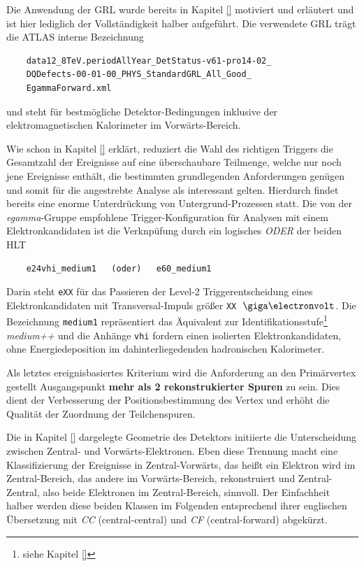 \begin{description}
        Die Anwendung der \ac{GRL} wurde bereits in Kapitel \ref{} motiviert
        und erläutert und ist hier lediglich der Vollständigkeit halber
        aufgeführt. Die verwendete \ac{GRL} trägt die ATLAS interne Bezeichnung
        \begin{verbatim}
    data12_8TeV.periodAllYear_DetStatus-v61-pro14-02_
    DQDefects-00-01-00_PHYS_StandardGRL_All_Good_
    EgammaForward.xml \end{verbatim}
        und steht für bestmögliche Detektor-Bedingungen inklusive der
        elektromagnetischen Kalorimeter im Vorwärts-Bereich.

        Wie schon in Kapitel \ref{} erklärt, reduziert die Wahl des richtigen
        Triggers die Gesamtzahl der Ereignisse auf eine überschaubare
        Teilmenge, welche nur noch jene Ereignisse enthält, die bestimmten
        grundlegenden Anforderungen genügen und somit für die angestrebte
        Analyse als interessant gelten. Hierdurch findet bereits eine enorme
        Unterdrückung von Untergrund-Prozessen statt. Die von der
        \textit{egamma}-Gruppe empfohlene Trigger-Konfiguration für Analysen
        mit einem Elektronkandidaten ist die Verknpüfung durch ein logisches
        \emph{ODER} der beiden \acl{HLT}
        \begin{verbatim}
    e24vhi_medium1   (oder)   e60_medium1 \end{verbatim}
        Darin steht \texttt{eXX} für das Passieren der Level-2
        Triggerentscheidung eines Elektronkandidaten mit Transversal-Impuls
        größer \texttt{XX} $\GeV$. Die Bezeichnung \texttt{medium1}
        repräsentiert das Äquivalent zur Identifikationsstufe\footnote{siehe
        Kapitel \ref{}} \textit{medium++} und die Anhänge \texttt{vhi} fordern
        einen isolierten Elektronkandidaten, ohne Energiedeposition im
        dahinterliegedenden hadronischen Kalorimeter.

        Als letztes ereignisbasiertes Kriterium wird die Anforderung an den
        Primärvertex gestellt Ausgangspunkt \textbf{mehr als 2 rekonstrukierter
        Spuren} zu sein. Dies dient der Verbesserung der Positionsbestimmung
        des Vertex und erhöht die Qualität der Zuordnung der Teilchenspuren.

        Die in Kapitel \ref{} dargelegte
        Geometrie des Detektors initiierte die Unterscheidung zwischen
        Zentral- und Vorwärts-Elektronen. Eben diese Trennung macht eine
        Klassifizierung der Ereignisse in Zentral-Vorwärts, das heißt ein
        Elektron wird im Zentral-Bereich, das andere im Vorwärts-Bereich,
        rekonstruiert und Zentral-Zentral, also beide Elektronen im
        Zentral-Bereich, sinnvoll. Der Einfachheit halber werden diese beiden
        Klassen im Folgenden entsprechend ihrer englischen Übersetzung mit
        \emph{CC} (central-central) und \emph{CF} (central-forward) abgekürzt. 


\end{description}
